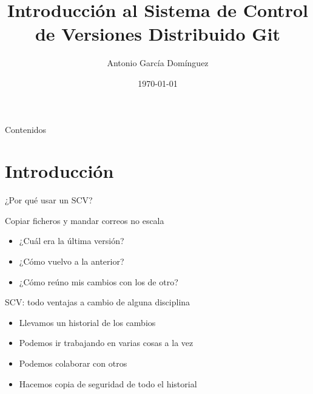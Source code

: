 \documentclass[compress,xcolor=svgnames]{beamer}
\title{Introducción al Sistema de Control de Versiones Distribuido Git}
\author{Antonio García Domínguez}
\date{\today}
\institute{Universidad de Cádiz}
\begin{document}
\begin{frame}
  \titlepage
\end{frame}

\begin{frame}{Contenidos}
  \tableofcontents
\end{frame}

\section{Introducción}

\begin{frame}{¿Por qué usar un SCV?}

  \begin{block}{Copiar ficheros y mandar correos no escala}
    \begin{itemize}
    \item ¿Cuál era la última versión?
    \item ¿Cómo vuelvo a la anterior?
    \item ¿Cómo reúno mis cambios con los de otro?
    \end{itemize}
  \end{block}

  \begin{block}{SCV: todo ventajas a cambio de alguna disciplina}
    \begin{itemize}
    \item Llevamos un historial de los cambios
    \item Podemos ir trabajando en varias cosas a la vez
    \item Podemos colaborar con otros
    \item Hacemos copia de seguridad de todo el historial
    \end{itemize}
  \end{block}
\end{frame}
\end{document}
